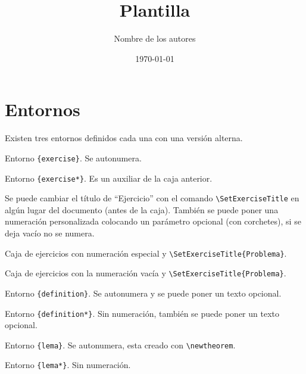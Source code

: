 \documentclass[11pt]{article}
\title{Plantilla}
\author{Nombre de los autores}
\date{\today}
\begin{document}
\maketitle


\section{Entornos}

Existen tres entornos definidos cada una con una versión alterna.

\begin{exercise}
  Entorno \verb|{exercise}|. Se autonumera.
\end{exercise}

\begin{exercise*}
  Entorno \verb|{exercise*}|. Es un auxiliar de la caja anterior.
\end{exercise*}

Se puede cambiar el título de ``Ejercicio'' con el comando \verb|\SetExerciseTitle| en algún lugar del documento (antes de la caja). También se puede poner una numeración personalizada colocando un parámetro opcional (con corchetes), si se deja vacío no se numera. 



\begin{exercise}
  Caja de ejercicios con numeración especial y \verb|\SetExerciseTitle{Problema}|.
\end{exercise}

\begin{exercise}[]
  Caja de ejercicios con la numeración vacía y \verb|\SetExerciseTitle{Problema}|.
\end{exercise}



\begin{definition}
  Entorno \verb|{definition}|. Se autonumera y se puede poner un texto opcional.
\end{definition}

\begin{definition*}
  Entorno \verb|{definition*}|. Sin numeración, también se puede poner un texto opcional.
\end{definition*}

\begin{lemma}
  Entorno \verb|{lema}|. Se autonumera, esta creado con \verb|\newtheorem|.
\end{lemma}

\begin{lemma*}
  Entorno \verb|{lema*}|. Sin numeración.
\end{lemma*}
\end{document}

